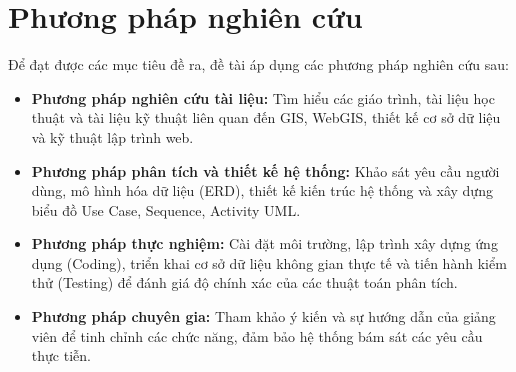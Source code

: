 \section{Phương pháp nghiên cứu}

Để đạt được các mục tiêu đề ra, đề tài áp dụng các phương pháp nghiên cứu sau:

\begin{itemize}
    \item \textbf{Phương pháp nghiên cứu tài liệu:} Tìm hiểu các giáo trình, tài liệu học thuật và tài liệu kỹ thuật liên quan đến GIS, WebGIS, thiết kế cơ sở dữ liệu và kỹ thuật lập trình web.
    \item \textbf{Phương pháp phân tích và thiết kế hệ thống:} Khảo sát yêu cầu người dùng, mô hình hóa dữ liệu (ERD), thiết kế kiến trúc hệ thống và xây dựng biểu đồ Use Case, Sequence, Activity UML.
    \item \textbf{Phương pháp thực nghiệm:} Cài đặt môi trường, lập trình xây dựng ứng dụng (Coding), triển khai cơ sở dữ liệu không gian thực tế và tiến hành kiểm thử (Testing) để đánh giá độ chính xác của các thuật toán phân tích.
    \item \textbf{Phương pháp chuyên gia:} Tham khảo ý kiến và sự hướng dẫn của giảng viên để tinh chỉnh các chức năng, đảm bảo hệ thống bám sát các yêu cầu thực tiễn.
\end{itemize}
